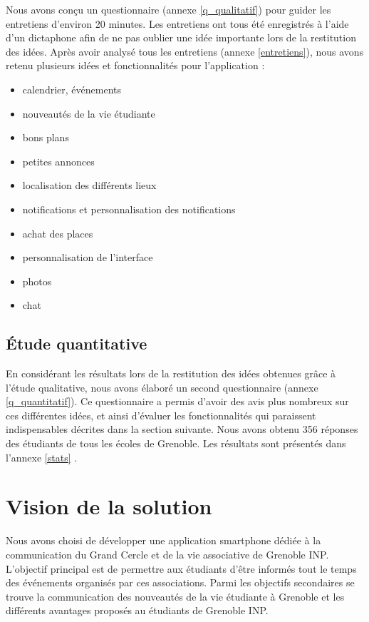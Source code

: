 \documentclass[a4paper, 11px]{article}
\begin{document}
Nous avons conçu un questionnaire (annexe \ref{q_qualitatif})
pour guider les entretiens d'environ 20 minutes.
Les entretiens ont tous été enregistrés à l'aide d'un dictaphone afin de ne pas oublier une idée importante lors de la restitution des idées. 
Après avoir analysé tous les entretiens (annexe \ref{entretiens}), nous avons retenu plusieurs idées et fonctionnalités pour l'application :
\begin {itemize}
	\item calendrier, événements
	\item nouveautés de la vie étudiante
	\item bons plans
	\item petites annonces
	\item localisation des différents lieux
	\item notifications et personnalisation des notifications
	\item achat des places
	\item personnalisation de l'interface
	\item photos
	\item chat
\end{itemize}

\subsection{Étude quantitative}
En considérant les résultats lors de la restitution des idées obtenues grâce à l'étude qualitative, nous avons élaboré un second questionnaire (annexe \ref{q_quantitatif}). Ce questionnaire a permis d'avoir des avis plus nombreux sur ces différentes idées, et ainsi d'évaluer les fonctionnalités qui paraissent indispensables décrites dans la section suivante.
Nous avons obtenu 356 réponses des étudiants de tous les écoles de Grenoble. Les résultats sont présentés dans l'annexe \ref{stats} .


\newpage

\section{Vision de la solution}

Nous avons choisi de développer une application smartphone dédiée à la communication du Grand Cercle et de la vie associative de Grenoble INP. L'objectif principal est de permettre aux étudiants d'être informés tout le temps des événements organisés par ces associations. Parmi les objectifs secondaires se trouve la communication des nouveautés de la vie étudiante à Grenoble et les différents avantages proposés au étudiants de Grenoble INP.
\end{document}
